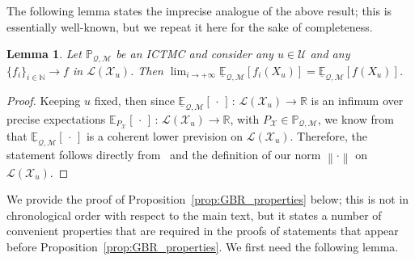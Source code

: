 \documentclass[3p]{elsarticle}
\newtheorem{lemma}[theorem]{Lemma}
\newcommand{\nats}{\mathbb{N}}
\newcommand{\reals}{\mathbb{R}}
\newcommand{\states}{\mathcal{X}}
\newcommand{\lexp}{\underline{\mathbb{E}}_{\rateset,\mathcal{M}}}
\newcommand{\gambles}{\mathcal{L}}
\newcommand{\rateset}{\mathcal{Q}}
\newcommand{\norm}[1]{\left\lVert #1 \right\rVert}
\begin{document}
The following lemma states the imprecise analogue of the above result; this is essentially well-known, but we repeat it here for the sake of completeness.

\begin{lemma}\label{lemma:limit_lexp_is_lexp_limit}
Let $\mathbb{P}_{\rateset,\mathcal{M}}$ be an ICTMC and consider any $u\in\mathcal{U}$ and any $\{f_i\}_{i\in\nats}\to f$ in $\gambles(\states_u)$. Then $\lim_{i\to+\infty}\lexp[f_i(X_u)]=\lexp[f(X_u)]$.
\end{lemma}
\begin{proof}
Keeping $u$ fixed, then since $\lexp[\,\cdot\,]\,:\,\gambles(\states_u)\to\reals$ is an infimum over precise expectations $\mathbb{E}_{P_\states}[\,\cdot\,]\,:\,\gambles(\states_u)\to\reals$, with $P_\states\in\mathbb{P}_{\rateset,\mathcal{M}}$, we know from~\cite[Theorem 3.3.3]{Walley:1991vk} that $\lexp[\,\cdot\,]$ is a coherent lower prevision on $\gambles(\states_u)$. Therefore, the statement follows directly from~\cite[Proposition 2.6.1.$\ell$]{Walley:1991vk} and the definition of our norm $\norm{\cdot}$ on $\gambles(\states_u)$.
\end{proof}


We provide the proof of Proposition~\ref{prop:GBR_properties} below; this is not in chronological order with respect to the main text, but it states a number of convenient properties that are required in the proofs of statements that appear before Proposition~\ref{prop:GBR_properties}. We first need the following lemma.
\end{document}
